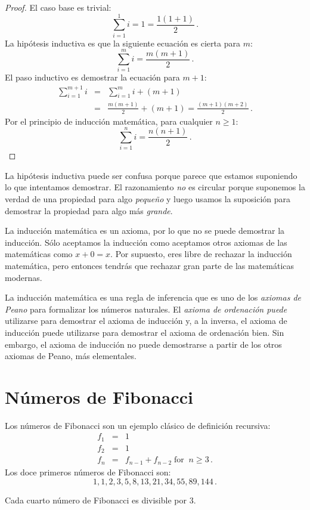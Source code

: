 \begin{proof} El caso base es trivial:
\[
\sum_{i=1}^1 i = 1 =\frac{1(1+1)}{2}\,.
\]
La hipótesis inductiva es que la siguiente ecuación es cierta para $m$:
\[
\sum_{i=1}^{m} i = \frac{m(m+1)}{2}\,.
\]
El paso inductivo es demostrar la ecuación para $m+1$:
\begin{eqnarray*}
\sum_{i=1}^{m+1} i &=& \sum_{i=1}^m i + (m+1)\label{l.sum1}\\
&=&\frac{m(m+1)}{2} + (m+1)\label{l.sum2}
=\frac{(m+1)(m+2)}{2}\,.\label{l.sum4}
\end{eqnarray*}
Por el principio de inducción matemática, para cualquier $n\geq 1$:
\[
\sum_{i=1}^n i = \frac{n(n+1)}{2}\,.
\]
\end{proof}

La hipótesis inductiva puede ser confusa porque parece que estamos suponiendo lo que intentamos demostrar. El razonamiento \emph{no} es circular porque suponemos la verdad de una propiedad para algo \emph{pequeño} y luego usamos la suposición para demostrar la propiedad para algo más \emph{grande}.

La inducción matemática es un axioma, por lo que no se puede demostrar la inducción. Sólo aceptamos la inducción como aceptamos otros axiomas de las matemáticas como $x+0=x$. Por supuesto, eres libre de rechazar la inducción matemática, pero entonces tendrás que rechazar gran parte de las matemáticas modernas.
\begin{advanced}
La inducción matemática es una regla de inferencia que es uno de los \emph{axiomas de Peano} para formalizar los números naturales. El \emph{axioma de ordenación puede} utilizarse para demostrar el axioma de inducción y, a la inversa, el axioma de inducción puede utilizarse para demostrar el axioma de ordenación bien. Sin embargo, el axioma de inducción no puede demostrarse a partir de los otros axiomas de Peano, más elementales.
\end{advanced}


\section{Números de Fibonacci}\label{s.induction-fibonacci}
Los números de Fibonacci son un ejemplo clásico de definición recursiva:
\begin{eqnarray*}
f_1 &=& 1\\
f_2 &=& 1\\
f_n &=& f_{n-1} + f_{n-2}\; \textrm{for} \;\; n \geq 3\,.
\end{eqnarray*}
Los doce primeros números de Fibonacci son:
\[
1, 1, 2, 3, 5, 8, 13, 21, 34, 55, 89, 144\,.
\]
\begin{theorem}\label{thm.fib-div3}
Cada cuarto número de Fibonacci es divisible por $3$.
\end{theorem}

